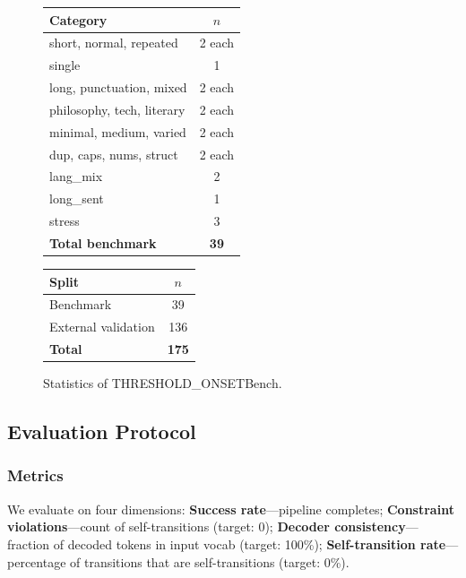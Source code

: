\documentclass[10pt]{article}
\begin{document}
\begin{figure}[t]
\centering
\begin{minipage}{0.48\textwidth}
\centering
\begin{tabular}{lc}
\toprule
\textbf{Category} & \textbf{$n$} \\
\midrule
short, normal, repeated & 2 each \\
single & 1 \\
long, punctuation, mixed & 2 each \\
philosophy, tech, literary & 2 each \\
minimal, medium, varied & 2 each \\
dup, caps, nums, struct & 2 each \\
lang\_mix & 2 \\
long\_sent & 1 \\
stress & 3 \\
\midrule
\textbf{Total benchmark} & \textbf{39} \\
\bottomrule
\end{tabular}
\end{minipage}
\hfill
\begin{minipage}{0.48\textwidth}
\centering
\begin{tabular}{lc}
\toprule
\textbf{Split} & \textbf{$n$} \\
\midrule
Benchmark & 39 \\
External validation & 136 \\
\midrule
\textbf{Total} & \textbf{175} \\
\bottomrule
\end{tabular}
\end{minipage}
\caption{Statistics of THRESHOLD\_ONSETBench.}
\label{fig:benchmark_stats}
\end{figure}

\subsection{Evaluation Protocol}

\subsubsection{Metrics}
We evaluate on four dimensions: \textbf{Success rate}---pipeline completes; \textbf{Constraint violations}---count of self-transitions (target: 0); \textbf{Decoder consistency}---fraction of decoded tokens in input vocab (target: 100\%); \textbf{Self-transition rate}---percentage of transitions that are self-transitions (target: 0\%).
\end{document}
